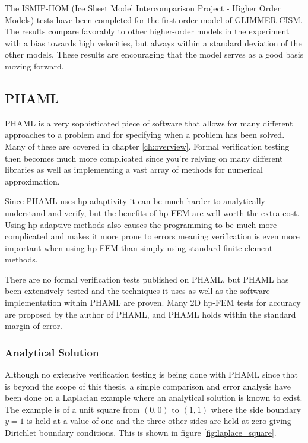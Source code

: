 The ISMIP-HOM (Ice Sheet Model Intercomparison Project - Higher Order Models) tests have been completed for the first-order model of GLIMMER-CISM.  The results compare favorably to other higher-order models in the experiment with a bias towards high velocities, but always within a standard deviation of the other models.\citep{Bocek:2009}  These results are encouraging that the model serves as a good basis moving forward.



\subsection{PHAML}\label{sec:chp5phaml}

PHAML is a very sophisticated piece of software that allows for many different approaches to a problem and for specifying when a problem has been solved.  Many of these are covered in chapter \ref{ch:overview}.  Formal verification testing then becomes much more complicated since you're relying on many different libraries as well as implementing a vast array of methods for numerical approximation.

Since PHAML uses hp-adaptivity it can be much harder to analytically understand and verify, but the benefits of hp-FEM are well worth the extra cost.  Using hp-adaptive methods also causes the programming to be much more complicated and makes it more prone to errors meaning verification is even more important when using hp-FEM than simply using standard finite element methods.
\citep{Demkowicz:2007}

There are no formal verification tests published on PHAML, but PHAML has been extensively tested and the techniques it uses as well as the software implementation within PHAML are proven.  Many 2D hp-FEM tests for accuracy are proposed by the author of PHAML, and PHAML holds within the standard margin of error. \citet{mitchell:2d}

\subsubsection{Analytical Solution}

Although no extensive verification testing is being done with PHAML since that is beyond the scope of this thesis, a simple comparison and error analysis have been done on a Laplacian example where an analytical solution is known to exist.  The example is of a unit square from $(0,0)$ to $(1,1)$ where the side boundary $y=1$ is held at a value of one and the three other sides are held at zero giving Dirichlet boundary conditions.  This is shown in figure \ref{fig:laplace_square}.

